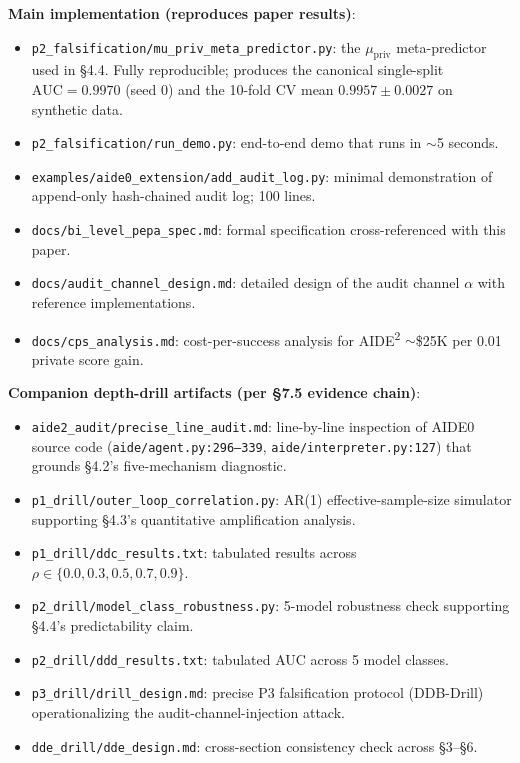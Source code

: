 \documentclass{article}
\theoremstyle{definition}
\begin{document}
\textbf{Main implementation (reproduces paper results)}:
\begin{itemize}
    \item \texttt{p2\_falsification/mu\_priv\_meta\_predictor.py}: the $\mu_{\text{priv}}$ meta-predictor used in \S4.4. Fully reproducible; produces the canonical single-split $\text{AUC}=0.9970$ (seed 0) and the 10-fold CV mean $0.9957\pm0.0027$ on synthetic data.
    \item \texttt{p2\_falsification/run\_demo.py}: end-to-end demo that runs in $\sim$5 seconds.
    \item \texttt{examples/aide0\_extension/add\_audit\_log.py}: minimal demonstration of append-only hash-chained audit log; 100 lines.
    \item \texttt{docs/bi\_level\_pepa\_spec.md}: formal specification cross-referenced with this paper.
    \item \texttt{docs/audit\_channel\_design.md}: detailed design of the audit channel $\alpha$ with reference implementations.
    \item \texttt{docs/cps\_analysis.md}: cost-per-success analysis for AIDE\textsuperscript{2} $\sim$\$25K per 0.01 private score gain.
\end{itemize}

\textbf{Companion depth-drill artifacts (per \S7.5 evidence chain)}:
\begin{itemize}
    \item \texttt{aide2\_audit/precise\_line\_audit.md}: line-by-line inspection of AIDE0 source code (\texttt{aide/agent.py:296--339}, \texttt{aide/interpreter.py:127}) that grounds \S4.2's five-mechanism diagnostic.
    \item \texttt{p1\_drill/outer\_loop\_correlation.py}: AR(1) effective-sample-size simulator supporting \S4.3's quantitative amplification analysis.
    \item \texttt{p1\_drill/ddc\_results.txt}: tabulated results across $\rho \in \{0.0, 0.3, 0.5, 0.7, 0.9\}$.
    \item \texttt{p2\_drill/model\_class\_robustness.py}: 5-model robustness check supporting \S4.4's predictability claim.
    \item \texttt{p2\_drill/ddd\_results.txt}: tabulated AUC across 5 model classes.
    \item \texttt{p3\_drill/drill\_design.md}: precise P3 falsification protocol (DDB-Drill) operationalizing the audit-channel-injection attack.
    \item \texttt{dde\_drill/dde\_design.md}: cross-section consistency check across \S3--\S6.
\end{itemize}
\end{document}
